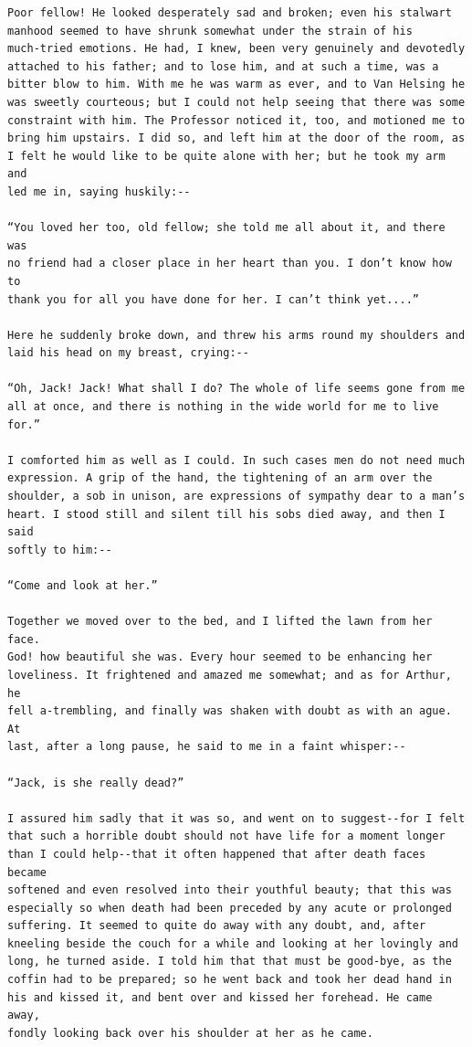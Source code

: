 \documentclass{article}
\begin{document}
\begin{verbatim}
Poor fellow! He looked desperately sad and broken; even his stalwart
manhood seemed to have shrunk somewhat under the strain of his
much-tried emotions. He had, I knew, been very genuinely and devotedly
attached to his father; and to lose him, and at such a time, was a
bitter blow to him. With me he was warm as ever, and to Van Helsing he
was sweetly courteous; but I could not help seeing that there was some
constraint with him. The Professor noticed it, too, and motioned me to
bring him upstairs. I did so, and left him at the door of the room, as
I felt he would like to be quite alone with her; but he took my arm and
led me in, saying huskily:--

“You loved her too, old fellow; she told me all about it, and there was
no friend had a closer place in her heart than you. I don’t know how to
thank you for all you have done for her. I can’t think yet....”

Here he suddenly broke down, and threw his arms round my shoulders and
laid his head on my breast, crying:--

“Oh, Jack! Jack! What shall I do? The whole of life seems gone from me
all at once, and there is nothing in the wide world for me to live for.”

I comforted him as well as I could. In such cases men do not need much
expression. A grip of the hand, the tightening of an arm over the
shoulder, a sob in unison, are expressions of sympathy dear to a man’s
heart. I stood still and silent till his sobs died away, and then I said
softly to him:--

“Come and look at her.”

Together we moved over to the bed, and I lifted the lawn from her face.
God! how beautiful she was. Every hour seemed to be enhancing her
loveliness. It frightened and amazed me somewhat; and as for Arthur, he
fell a-trembling, and finally was shaken with doubt as with an ague. At
last, after a long pause, he said to me in a faint whisper:--

“Jack, is she really dead?”

I assured him sadly that it was so, and went on to suggest--for I felt
that such a horrible doubt should not have life for a moment longer
than I could help--that it often happened that after death faces became
softened and even resolved into their youthful beauty; that this was
especially so when death had been preceded by any acute or prolonged
suffering. It seemed to quite do away with any doubt, and, after
kneeling beside the couch for a while and looking at her lovingly and
long, he turned aside. I told him that that must be good-bye, as the
coffin had to be prepared; so he went back and took her dead hand in
his and kissed it, and bent over and kissed her forehead. He came away,
fondly looking back over his shoulder at her as he came.


\end{verbatim}
\end{document}
